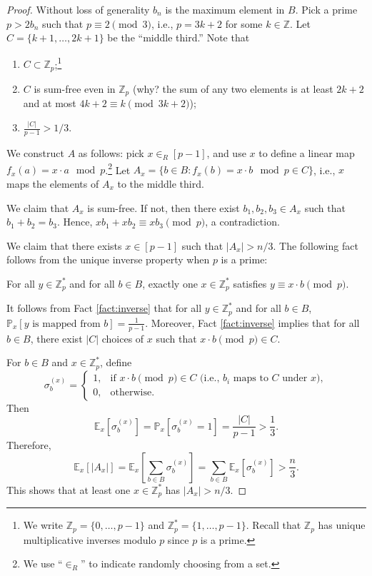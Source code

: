 \documentclass[letterpaper, reqno,11pt]{article}
\newcommand{\ZZ}{\mathbb{Z}}
\newcommand{\PP}{\mathbb{P}}
\newcommand{\EE}{\mathbb{E}}
\begin{document}
\begin{proof}
  Without loss of generality $b_n$ is the maximum element in $B$. Pick a prime $p > 2b_n$ such that $p \equiv 2 \pmod{3}$, i.e., $p = 3k + 2$ for some $k \in \ZZ$. Let $C = \{ k + 1, \ldots, 2k + 1 \}$ be the ``middle third.'' Note that
  \begin{enumerate}[label=(\roman*), itemsep=0pt]
    \item $C \subset \ZZ_p$;\footnote{We write $\ZZ_p = \{ 0, \ldots, p - 1 \}$ and $\ZZ_p^* = \{ 1, \ldots, p - 1 \}$. Recall that $\ZZ_p$ has unique multiplicative inverses modulo $p$ since $p$ is a prime.}
    \item $C$ is sum-free even in $\ZZ_p$ (why? the sum of any two elements is at least $2k + 2$ and at most $4k+2 \equiv k \pmod{3k + 2}$);
    \item $\frac{|C|}{p - 1} > 1/3$.
  \end{enumerate}
  We construct $A$ as follows: pick $x \in_R [p - 1]$, and use $x$ to define a linear map $f_x(a) = x \cdot a \mod{p}$.\footnote{We use ``$\in_R$'' to indicate randomly choosing from a set.} Let $A_x = \{ b \in B : f_x(b) = x \cdot b \mod{p} \in C \}$, i.e., $x$ maps the elements of $A_x$ to the middle third.

  We claim that $A_x$ is sum-free. If not, then there exist $b_1, b_2, b_3 \in A_x$ such that $b_1 + b_2 = b_3$. Hence, $xb_1 + xb_2 \equiv xb_3 \pmod{p}$, a contradiction.

  We claim that there exists $x \in [p - 1]$ such that $|A_x| > n/3$. The following fact follows from the unique inverse property when $p$ is a prime:

  \begin{fact} \label{fact:inverse}
    For all $y \in \ZZ_p^*$ and for all $b \in B$, exactly one $x \in \ZZ_p^*$ satisfies $y \equiv x \cdot b \pmod{p}$.
  \end{fact}

  It follows from Fact \ref{fact:inverse} that for all $y \in \ZZ_p^*$ and for all $b \in B$, $\PP_x[\text{$y$ is mapped from $b$}] = \frac{1}{p - 1}$. Moreover, Fact \ref{fact:inverse} implies that for all $b \in B$, there exist $|C|$ choices of $x$ such that $x \cdot b \pmod{p} \in C$.

  For $b \in B$ and $x \in \ZZ_p^*$, define
  $$ \sigma_b^{(x)} = \left\{
    \begin{array}{ll}
      1, & \text{if $x \cdot b \pmod{p} \in C$ (i.e., $b_i$ maps to $C$ under $x$)}, \\
      0, & \text{otherwise}.
    \end{array}
  \right. $$
  Then
  $$ \EE_x\left[\sigma_b^{(x)}\right] = \PP_x\left[\sigma_b^{(x)} = 1\right] = \frac{|C|}{p - 1} > \frac{1}{3}. $$
  Therefore,
  $$ \EE_x\left[\left|A_x\right|\right] = \EE_x\left[\sum_{b \in B} \sigma_b^{(x)}\right] = \sum_{b \in B} \EE_x\left[\sigma_b^{(x)}\right] > \frac{n}{3}. $$
  This shows that at least one $x \in \ZZ_p^*$ has $|A_x| > n/3$.
\end{proof}
\end{document}
